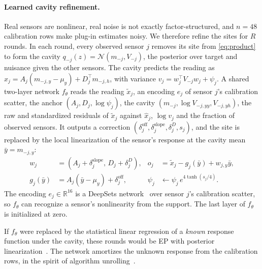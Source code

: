 \documentclass{article}
\newcommand{\R}{\mathbb{R}}
\newcommand{\N}{\mathcal{N}}
\begin{document}
\paragraph{Learned cavity refinement.}
Real sensors are nonlinear, real noise is not exactly factor-structured, and $n=48$ calibration rows make plug-in
estimates noisy. We therefore refine the sites for $R$ rounds. In each round, every observed sensor $j$ removes its
site from \eqref{eq:product} to form the cavity $q_{-j}(z)=\N(m_{-j},V_{-j})$, the posterior over target and nuisance
given the other sensors. The cavity predicts the reading as $\hat x_j=A_j(m_{-j,y}-\mu_y)+D_j^\top m_{-j,h}$, with
variance $v_j=w_j^\top V_{-j}w_j+\psi_j$. A shared two-layer network $f_\theta$ reads the reading $\tilde x_j$, an
encoding $e_j$ of sensor $j$'s calibration scatter, the anchor $(A_j,D_j,\log\psi_j)$, the cavity
$(m_{-j},\log V_{-j,yy},V_{-j,yh})$, the raw and standardized residuals of $\tilde x_j$ against $\hat x_j$, $\log v_j$
and the fraction of observed sensors. It outputs a correction
$(\delta^{\mathrm{off}}_j,\delta^{\mathrm{slope}}_j,\delta^{D}_j,s_j)$, and the site is replaced by the local
linearization of the sensor's response at the cavity mean $\bar y=m_{-j,y}$:
\begin{equation}
  \begin{aligned}
  w_j&=(A_j+\delta^{\mathrm{slope}}_j,\,D_j+\delta^{D}_j), & o_j&=\tilde x_j-g_j(\bar y)+w_{j,y}\bar y,\\
  g_j(\bar y)&=A_j(\bar y-\mu_y)+\delta^{\mathrm{off}}_j, & \psi_j&\leftarrow\psi_j\,e^{4\tanh(s_j/4)} .
  \end{aligned}
  \label{eq:relin}
\end{equation}
The encoding $e_j\in\R^{16}$ is a DeepSets network~\citep{zaheer2017deepsets} over sensor $j$'s calibration scatter,
so $f_\theta$ can recognize a sensor's nonlinearity from the support. The last layer of $f_\theta$ is initialized at
zero.

If $f_\theta$ were replaced by the statistical linear regression of a \emph{known} response function under the cavity,
these rounds would be EP with posterior linearization~\citep{deisenroth2012ep,garciafernandez2015plf}. The network
amortizes the unknown response from the calibration rows, in the spirit of algorithm
unrolling~\citep{gregor2010lista,monga2021unrolling}.
\end{document}
